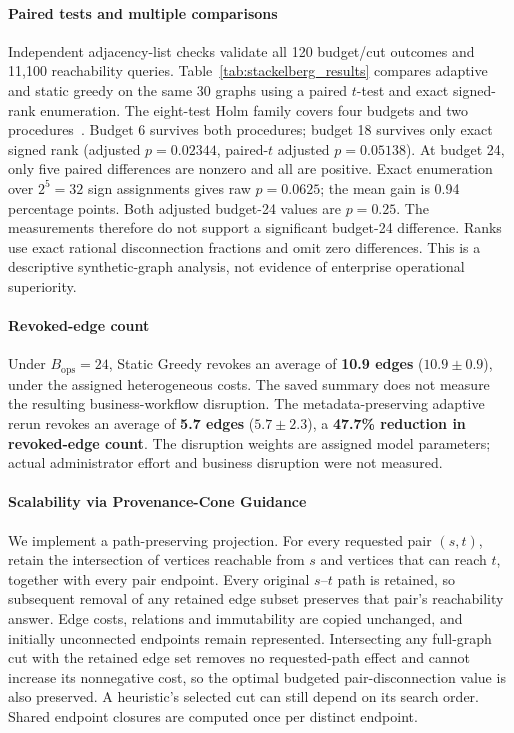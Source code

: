 \paragraph{Paired tests and multiple comparisons}
Independent adjacency-list checks validate all 120 budget/cut outcomes and 11,100 reachability queries. Table~\ref{tab:stackelberg_results} compares adaptive and static greedy on the same 30 graphs using a paired $t$-test and exact signed-rank enumeration. The eight-test Holm family covers four budgets and two procedures~\cite{holm1979simple}. Budget 6 survives both procedures; budget 18 survives only exact signed rank (adjusted $p=0.02344$, paired-$t$ adjusted $p=0.05138$). At budget 24, only five paired differences are nonzero and all are positive. Exact enumeration over $2^5=32$ sign assignments gives raw $p=0.0625$; the mean gain is 0.94 percentage points. Both adjusted budget-24 values are $p=0.25$. The measurements therefore do not support a significant budget-24 difference. Ranks use exact rational disconnection fractions and omit zero differences. This is a descriptive synthetic-graph analysis, not evidence of enterprise operational superiority.

\paragraph{Revoked-edge count}
Under $B_{\text{ops}} = 24$, Static Greedy revokes an average of \textbf{10.9 edges} ($10.9 \pm 0.9$), under the assigned heterogeneous costs. The saved summary does not measure the resulting business-workflow disruption. The metadata-preserving adaptive rerun revokes an average of \textbf{5.7 edges} ($5.7 \pm 2.3$), a \textbf{47.7\% reduction in revoked-edge count}. The disruption weights are assigned model parameters; actual administrator effort and business disruption were not measured.



\paragraph{Scalability via Provenance-Cone Guidance}
We implement a path-preserving projection. For every requested pair $(s,t)$, retain the intersection of vertices reachable from $s$ and vertices that can reach $t$, together with every pair endpoint. Every original $s$--$t$ path is retained, so subsequent removal of any retained edge subset preserves that pair's reachability answer. Edge costs, relations and immutability are copied unchanged, and initially unconnected endpoints remain represented. Intersecting any full-graph cut with the retained edge set removes no requested-path effect and cannot increase its nonnegative cost, so the optimal budgeted pair-disconnection value is also preserved. A heuristic's selected cut can still depend on its search order. Shared endpoint closures are computed once per distinct endpoint.

